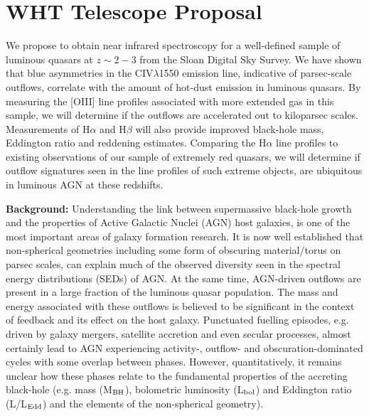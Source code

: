 \section{WHT Telescope Proposal}

We propose to obtain near infrared spectroscopy for a well-defined
sample of luminous quasars at $z\sim2-3$ from the Sloan Digital Sky
Survey. We have shown that blue asymmetries in the CIV$\lambda$1550
emission line, indicative of parsec-scale outflows, correlate with the
amount of hot-dust emission in luminous quasars. By measuring the
[OIII] line profiles associated with more extended gas in this sample,
we will determine if the outflows are accelerated out to kiloparsec
scales. Measurements of H$\alpha$ and H$\beta$ will also provide
improved black-hole mass, Eddington ratio and reddening
estimates. Comparing the H$\alpha$ line profiles to existing
observations of our sample of extremely red quasars, we will determine
if outflow signatures seen in the line profiles of such extreme
objects, are ubiquitous in luminous AGN at these redshifts.

\textbf{Background:} Understanding the link between supermassive
black-hole growth and the properties of Active Galactic Nuclei (AGN)
host galaxies, is one of the most important areas of galaxy formation
research. It is now well established that non-spherical geometries
including some form of obscuring material/torus on parsec scales, can
explain much of the observed diversity seen in the
spectral energy distributions (SEDs) of AGN. At the same time,
AGN-driven outflows are present in a large fraction of the luminous
quasar population.  The mass and energy associated with these outflows
is believed to be significant in the context of feedback and its
effect on the host galaxy. Punctuated fuelling episodes, e.g. driven
by galaxy mergers, satellite accretion and even secular processes,
almost certainly lead to AGN experiencing activity-, outflow- and
obscuration-dominated cycles with some overlap between phases.
However, quantitatively, it remains unclear how these phases relate to
the fundamental properties of the accreting black-hole (e.g.  mass
(M$_{\rm{BH}}$), bolometric luminosity (L$_{\rm{bol}}$) and Eddington
ratio (L/L$_{\rm{Edd}}$) and the elements of the non-spherical geometry).

\vspace{1.5mm}

